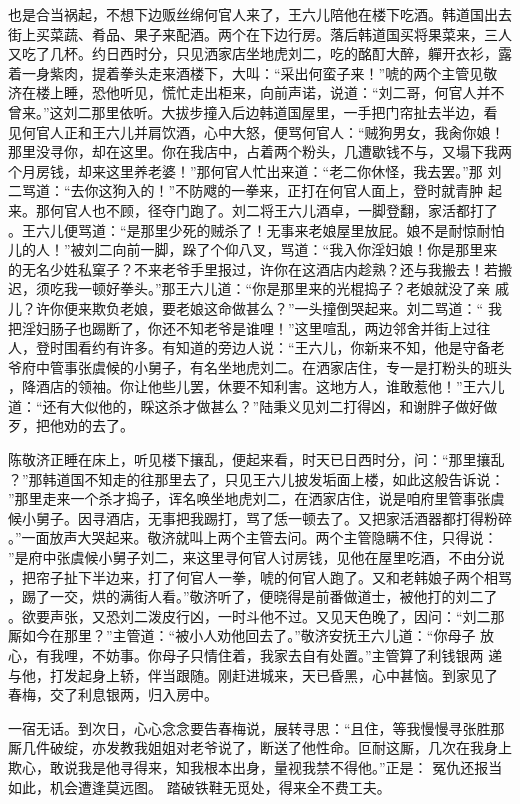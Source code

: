 也是合当祸起，不想下边贩丝绵何官人来了，王六儿陪他在楼下吃酒。韩道国出去
街上买菜蔬、肴品、果子来配酒。两个在下边行房。落后韩道国买将果菜来，三人
又吃了几杯。约日西时分，只见洒家店坐地虎刘二，吃的酩酊大醉，軃开衣衫，露
着一身紫肉，提着拳头走来酒楼下，大叫：“采出何蛮子来！”唬的两个主管见敬
济在楼上睡，恐他听见，慌忙走出柜来，向前声诺，说道：“刘二哥，何官人并不
曾来。”这刘二那里依听。大拔步撞入后边韩道国屋里，一手把门帘扯去半边，看
见何官人正和王六儿并肩饮酒，心中大怒，便骂何官人：“贼狗男女，我肏你娘！
那里没寻你，却在这里。你在我店中，占着两个粉头，几遭歇钱不与，又塌下我两
个月房钱，却来这里养老婆！”那何官人忙出来道：“老二你休怪，我去罢。”那
刘二骂道：“去你这狗入的！”不防飕的一拳来，正打在何官人面上，登时就青肿
起来。那何官人也不顾，径夺门跑了。刘二将王六儿酒卓，一脚登翻，家活都打了
。王六儿便骂道：“是那里少死的贼杀了！无事来老娘屋里放屁。娘不是耐惊耐怕
儿的人！”被刘二向前一脚，跺了个仰八叉，骂道：“我入你淫妇娘！你是那里来
的无名少姓私窠子？不来老爷手里报过，许你在这酒店内趁熟？还与我搬去！若搬
迟，须吃我一顿好拳头。”那王六儿道：“你是那里来的光棍捣子？老娘就没了亲
戚儿？许你便来欺负老娘，要老娘这命做甚么？”一头撞倒哭起来。刘二骂道：“
我把淫妇肠子也踢断了，你还不知老爷是谁哩！”这里喧乱，两边邻舍并街上过往
人，登时围看约有许多。有知道的旁边人说：“王六儿，你新来不知，他是守备老
爷府中管事张虞候的小舅子，有名坐地虎刘二。在洒家店住，专一是打粉头的班头
，降酒店的领袖。你让他些儿罢，休要不知利害。这地方人，谁敢惹他！”王六儿
道：“还有大似他的，睬这杀才做甚么？”陆秉义见刘二打得凶，和谢胖子做好做
歹，把他劝的去了。

陈敬济正睡在床上，听见楼下攘乱，便起来看，时天已日西时分，问：“那里攘乱
？”那韩道国不知走的往那里去了，只见王六儿披发垢面上楼，如此这般告诉说：
”那里走来一个杀才捣子，诨名唤坐地虎刘二，在洒家店住，说是咱府里管事张虞
候小舅子。因寻酒店，无事把我踢打，骂了恁一顿去了。又把家活酒器都打得粉碎
。”一面放声大哭起来。敬济就叫上两个主管去问。两个主管隐瞒不住，只得说：
”是府中张虞候小舅子刘二，来这里寻何官人讨房钱，见他在屋里吃酒，不由分说
，把帘子扯下半边来，打了何官人一拳，唬的何官人跑了。又和老韩娘子两个相骂
，踢了一交，烘的满街人看。”敬济听了，便晓得是前番做道士，被他打的刘二了
。欲要声张，又恐刘二泼皮行凶，一时斗他不过。又见天色晚了，因问：“刘二那
厮如今在那里？”主管道：“被小人劝他回去了。”敬济安抚王六儿道：“你母子
放心，有我哩，不妨事。你母子只情住着，我家去自有处置。”主管算了利钱银两
递与他，打发起身上轿，伴当跟随。刚赶进城来，天已昏黑，心中甚恼。到家见了
春梅，交了利息银两，归入房中。

一宿无话。到次日，心心念念要告春梅说，展转寻思：“且住，等我慢慢寻张胜那
厮几件破绽，亦发教我姐姐对老爷说了，断送了他性命。叵耐这厮，几次在我身上
欺心，敢说我是他寻得来，知我根本出身，量视我禁不得他。”正是：
冤仇还报当如此，机会遭逢莫远图。
踏破铁鞋无觅处，得来全不费工夫。

